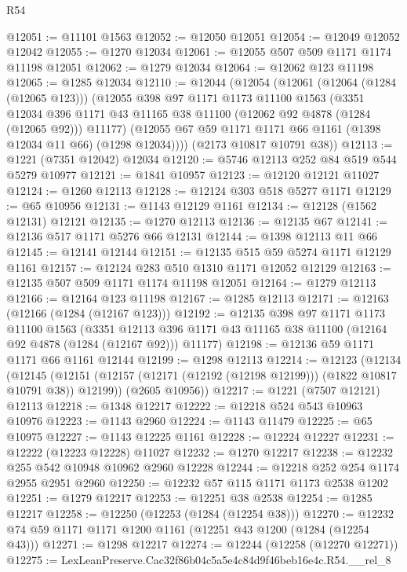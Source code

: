 \begin{lexlean}{R54}
\begin{coremodule}
@12051 := @11101 @1563
@12052 := @12050 @12051
@12054 := @12049 @12052 @12042
@12055 := @1270 @12034
@12061 := @12055 @507 @509 @1171 @1174 @11198 @12051
@12062 := @1279 @12034
@12064 := @12062 @123 @11198
@12065 := @1285 @12034
@12110 := @12044
    (@12054
      (@12061
        (@12064 (@1284 (@12065 @123)))
        (@12055
          @398
          @97
          @1171
          @1173
          @11100
          @1563
          (@3351
            @12034
            @396
            @1171
            @43
            @11165
            @38
            @11100
            (@12062 @92 @4878 (@1284 (@12065 @92)))
            @11177)
          (@12055 @67 @59 @1171 @1171 @66 @1161 (@1398 @12034 @11 @66) (@1298 @12034))))
      (@2173 @10817 @10791 @38))
@12113 := @1221 (@7351 @12042) @12034
@12120 := @5746 @12113 @252 @84 @519 @544 @5279 @10977
@12121 := @1841 @10957
@12123 := @12120 @12121 @11027
@12124 := @1260 @12113
@12128 := @12124 @303 @518 @5277 @1171
@12129 := @65 @10956
@12131 := @1143 @12129 @1161
@12134 := @12128 (@1562 @12131) @12121
@12135 := @1270 @12113
@12136 := @12135 @67
@12141 := @12136 @517 @1171 @5276 @66 @12131
@12144 := @1398 @12113 @11 @66
@12145 := @12141 @12144
@12151 := @12135 @515 @59 @5274 @1171 @12129 @1161
@12157 := @12124 @283 @510 @1310 @1171 @12052 @12129
@12163 := @12135 @507 @509 @1171 @1174 @11198 @12051
@12164 := @1279 @12113
@12166 := @12164 @123 @11198
@12167 := @1285 @12113
@12171 := @12163 (@12166 (@1284 (@12167 @123)))
@12192 := @12135
    @398
    @97
    @1171
    @1173
    @11100
    @1563
    (@3351 @12113 @396 @1171 @43 @11165 @38 @11100 (@12164 @92 @4878 (@1284 (@12167 @92))) @11177)
@12198 := @12136 @59 @1171 @1171 @66 @1161 @12144
@12199 := @1298 @12113
@12214 := @12123
    (@12134
      (@12145 (@12151 (@12157 (@12171 (@12192 (@12198 @12199))) (@1822 @10817 @10791 @38)) @12199))
      (@2605 @10956))
@12217 := @1221 (@7507 @12121) @12113
@12218 := @1348 @12217
@12222 := @12218 @524 @543 @10963 @10976
@12223 := @1143 @2960
@12224 := @1143 @11479
@12225 := @65 @10975
@12227 := @1143 @12225 @1161
@12228 := @12224 @12227
@12231 := @12222 (@12223 @12228) @11027
@12232 := @1270 @12217
@12238 := @12232 @255 @542 @10948 @10962 @2960 @12228
@12244 := @12218 @252 @254 @1174 @2955 @2951 @2960
@12250 := @12232 @57 @115 @1171 @1173 @2538 @1202
@12251 := @1279 @12217
@12253 := @12251 @38 @2538
@12254 := @1285 @12217
@12258 := @12250 (@12253 (@1284 (@12254 @38)))
@12270 := @12232 @74 @59 @1171 @1171 @1200 @1161 (@12251 @43 @1200 (@1284 (@12254 @43)))
@12271 := @1298 @12217
@12274 := @12244 (@12258 (@12270 @12271))
@12275 := LexLeanPreserve.Cac32f86b04c5a5e4c84d9f46beb16e4c.R54.__rel_8

\end{coremodule}
\end{lexlean}
